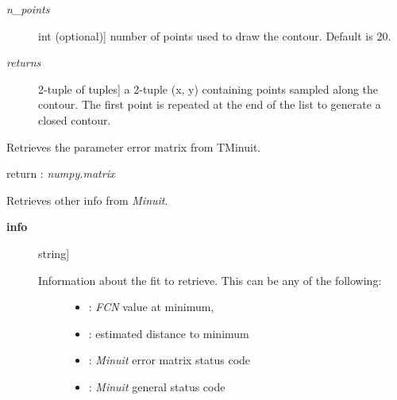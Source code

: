 \documentclass[a4paper,10pt,english]{sphinxmanual}
\begin{document}
\begin{fulllineitems}
\begin{fulllineitems}
\begin{description}
\item[{\emph{n\_points}}] \leavevmode{[}int (optional){]}
number of points used to draw the contour. Default is 20.

\item[{\emph{returns}}] \leavevmode{[}2-tuple of tuples{]}
a 2-tuple (x, y) containing  points sampled
along the contour. The first point is repeated at the end
of the list to generate a closed contour.

\end{description}

\end{fulllineitems}


\begin{fulllineitems}
\label{index:kafe.minuit.Minuit.get_error_matrix}
Retrieves the parameter error matrix from TMinuit.

return : \emph{numpy.matrix}

\end{fulllineitems}


\begin{fulllineitems}
\label{index:kafe.minuit.Minuit.get_fit_info}
Retrieves other info from \emph{Minuit}.
\begin{description}
\item[{\textbf{info}}] \leavevmode{[}string{]}\begin{description}
\item[{Information about the fit to retrieve. This can be any of the following:}] \leavevmode\begin{itemize}
\item {} 
: \emph{FCN} value at minimum,

\item {} 
: estimated distance to minimum

\item {} 
: \emph{Minuit} error matrix status code

\item {} 
: \emph{Minuit} general status code

\end{itemize}

\end{description}


\end{description}
\end{fulllineitems}
\end{fulllineitems}
\end{document}
